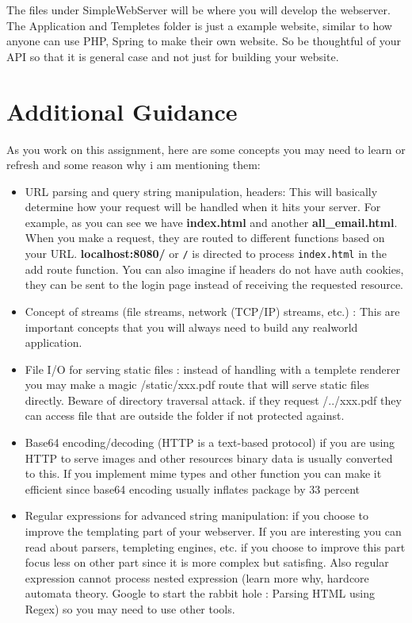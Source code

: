 \documentclass{article}
\begin{document}
The files under SimpleWebServer will be where you will develop the webserver. The Application and Templetes folder is just a example website, similar to how anyone can use PHP, Spring to make their own website. So be thoughtful of your API so that it is general case and not just for building your website.

\section{Additional Guidance}
As you work on this assignment, here are some concepts you may need to learn or refresh and some reason why i am mentioning them:
\begin{itemize}
    \item URL parsing and query string manipulation, headers: This will basically determine how your request will be handled when it hits your server. For example, as you can see we have \textbf{index.html} and another \textbf{all\_email.html}. When you make a request, they are routed to different functions based on your URL. \textbf{localhost:8080/} or \texttt{/} is directed to process \texttt{index.html} in the add route function. You can also imagine if headers do not have auth cookies, they can be sent to the login page instead of receiving the requested resource.
    \item Concept of streams (file streams, network (TCP/IP) streams, etc.) : This are important concepts that you will always need to build any realworld application.
    \item File I/O for serving static files : instead of handling with a templete renderer you may make a magic /static/xxx.pdf route that will serve static files directly. Beware of directory traversal attack. if they request /../xxx.pdf they can access file that are outside the folder if not protected against.  
    \item Base64 encoding/decoding (HTTP is a text-based protocol) if you are using HTTP to serve images and other resources binary data is usually converted to this. If you implement mime types and other function you can make it efficient since base64 encoding usually inflates package by 33 percent
    \item Regular expressions for advanced string manipulation: if you choose to improve the templating part of your webserver. If you are interesting you can read about parsers, templeting engines, etc. if you choose to improve this part focus less on other part since it is more complex but satisfing. Also regular expression cannot process nested expression (learn more why, hardcore automata theory. Google to start the rabbit hole : Parsing HTML using Regex) so you may need to use other tools. 

\end{itemize}
\end{document}
